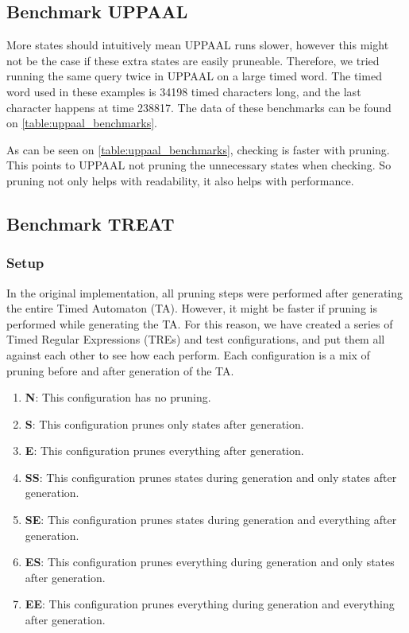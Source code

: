 \subsection{Benchmark UPPAAL}\label{sub:benchmark_uppaal}
More states should intuitively mean UPPAAL runs slower, however this might not be the case if these extra states are easily pruneable.
Therefore, we tried running the same query twice in UPPAAL on a large timed word.
The timed word used in these examples is 34198 timed characters long, and the last character happens at time 238817.
The data of these benchmarks can be found on \cref{table:uppaal_benchmarks}.



As can be seen on \cref{table:uppaal_benchmarks}, checking is faster with pruning.
This points to UPPAAL not pruning the unnecessary states when checking.
So pruning not only helps with readability, it also helps with performance.

\subsection{Benchmark TREAT}\label{sub:benchmark_treat}
\subsubsection{Setup}
In the original implementation, all pruning steps were performed after generating the entire Timed Automaton (TA).
However, it might be faster if pruning is performed while generating the TA.
For this reason, we have created a series of Timed Regular Expressions (TREs) and test configurations, and put them all against each other to see how each perform.
Each configuration is a mix of pruning before and after generation of the TA.

\begin{enumerate}
    \item \textbf{N}: This configuration has no pruning.
    \item \textbf{S}: This configuration prunes only states after generation.
    \item \textbf{E}: This configuration prunes everything after generation.
    \item \textbf{SS}: This configuration prunes states during generation and only states after generation.
    \item \textbf{SE}: This configuration prunes states during generation and everything after generation.
    \item \textbf{ES}: This configuration prunes everything during generation and only states after generation.
    \item \textbf{EE}: This configuration prunes everything during generation and everything after generation.
\end{enumerate}


